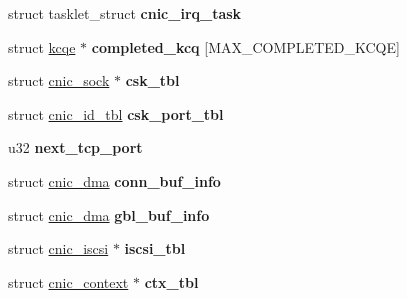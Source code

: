 \begin{DoxyCompactItemize}
\item 
\hypertarget{structcnic__local_a3c864c2b0021c0e5eed71a6616fd01eb}{
struct tasklet\_\-struct {\bfseries cnic\_\-irq\_\-task}}
\label{structcnic__local_a3c864c2b0021c0e5eed71a6616fd01eb}

\item 
\hypertarget{structcnic__local_ae725f08720207a7c9483afe45d810541}{
struct \hyperlink{structkcqe}{kcqe} $\ast$ {\bfseries completed\_\-kcq} \mbox{[}MAX\_\-COMPLETED\_\-KCQE\mbox{]}}
\label{structcnic__local_ae725f08720207a7c9483afe45d810541}

\item 
\hypertarget{structcnic__local_aa1ca6821766c7063a7c9d2ef307b7f94}{
struct \hyperlink{structcnic__sock}{cnic\_\-sock} $\ast$ {\bfseries csk\_\-tbl}}
\label{structcnic__local_aa1ca6821766c7063a7c9d2ef307b7f94}

\item 
\hypertarget{structcnic__local_ad56a9fa8dad515545d31860c277bb86a}{
struct \hyperlink{structcnic__id__tbl}{cnic\_\-id\_\-tbl} {\bfseries csk\_\-port\_\-tbl}}
\label{structcnic__local_ad56a9fa8dad515545d31860c277bb86a}

\item 
\hypertarget{structcnic__local_a6b6e1601855632ee9808786e25def600}{
u32 {\bfseries next\_\-tcp\_\-port}}
\label{structcnic__local_a6b6e1601855632ee9808786e25def600}

\item 
\hypertarget{structcnic__local_ae735ea8f0269064383c370a8a9ced12f}{
struct \hyperlink{structcnic__dma}{cnic\_\-dma} {\bfseries conn\_\-buf\_\-info}}
\label{structcnic__local_ae735ea8f0269064383c370a8a9ced12f}

\item 
\hypertarget{structcnic__local_affe50f365adfb007d77929c9d5677b80}{
struct \hyperlink{structcnic__dma}{cnic\_\-dma} {\bfseries gbl\_\-buf\_\-info}}
\label{structcnic__local_affe50f365adfb007d77929c9d5677b80}

\item 
\hypertarget{structcnic__local_a0bb60a6999b7e0c6704bd68545d77d13}{
struct \hyperlink{structcnic__iscsi}{cnic\_\-iscsi} $\ast$ {\bfseries iscsi\_\-tbl}}
\label{structcnic__local_a0bb60a6999b7e0c6704bd68545d77d13}

\item 
\hypertarget{structcnic__local_a1b3735093cd94372b0e3f1a52056a185}{
struct \hyperlink{structcnic__context}{cnic\_\-context} $\ast$ {\bfseries ctx\_\-tbl}}
\label{structcnic__local_a1b3735093cd94372b0e3f1a52056a185}


\end{DoxyCompactItemize}

